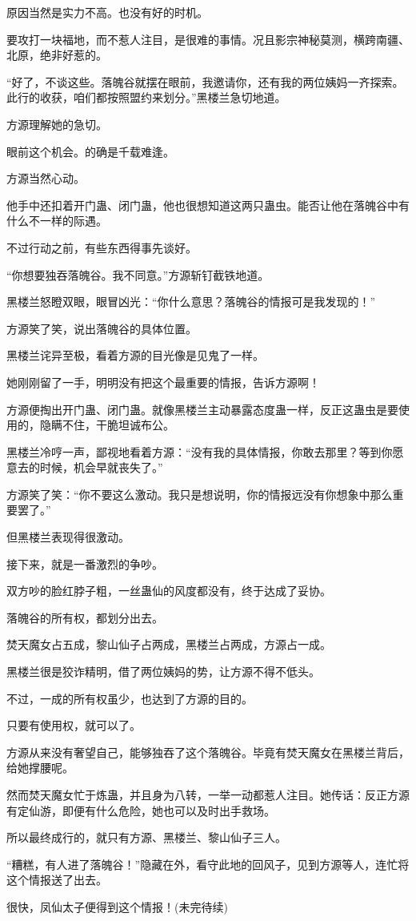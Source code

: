 \begin{this_body}
原因当然是实力不高。也没有好的时机。

要攻打一块福地，而不惹人注目，是很难的事情。况且影宗神秘莫测，横跨南疆、北原，绝非好惹的。

“好了，不谈这些。落魄谷就摆在眼前，我邀请你，还有我的两位姨妈一齐探索。此行的收获，咱们都按照盟约来划分。”黑楼兰急切地道。

方源理解她的急切。

眼前这个机会。的确是千载难逢。

方源当然心动。

他手中还扣着开门蛊、闭门蛊，他也很想知道这两只蛊虫。能否让他在落魄谷中有什么不一样的际遇。

不过行动之前，有些东西得事先谈好。

“你想要独吞落魄谷。我不同意。”方源斩钉截铁地道。

黑楼兰怒瞪双眼，眼冒凶光：“你什么意思？落魄谷的情报可是我发现的！”

方源笑了笑，说出落魄谷的具体位置。

黑楼兰诧异至极，看着方源的目光像是见鬼了一样。

她刚刚留了一手，明明没有把这个最重要的情报，告诉方源啊！

方源便掏出开门蛊、闭门蛊。就像黑楼兰主动暴露态度蛊一样，反正这蛊虫是要使用的，隐瞒不住，干脆坦诚布公。

黑楼兰冷哼一声，鄙视地看着方源：“没有我的具体情报，你敢去那里？等到你愿意去的时候，机会早就丧失了。”

方源笑了笑：“你不要这么激动。我只是想说明，你的情报远没有你想象中那么重要罢了。”

但黑楼兰表现得很激动。

接下来，就是一番激烈的争吵。

双方吵的脸红脖子粗，一丝蛊仙的风度都没有，终于达成了妥协。

落魄谷的所有权，都划分出去。

焚天魔女占五成，黎山仙子占两成，黑楼兰占两成，方源占一成。

黑楼兰很是狡诈精明，借了两位姨妈的势，让方源不得不低头。

不过，一成的所有权虽少，也达到了方源的目的。

只要有使用权，就可以了。

方源从来没有奢望自己，能够独吞了这个落魄谷。毕竟有焚天魔女在黑楼兰背后，给她撑腰呢。

然而焚天魔女忙于炼蛊，并且身为八转，一举一动都惹人注目。她传话：反正方源有定仙游，即便有什么危险，她也可以及时出手救场。

所以最终成行的，就只有方源、黑楼兰、黎山仙子三人。

“糟糕，有人进了落魄谷！”隐藏在外，看守此地的回风子，见到方源等人，连忙将这个情报送了出去。

很快，凤仙太子便得到这个情报！(未完待续)

\end{this_body}

